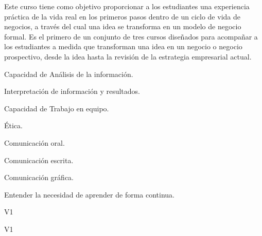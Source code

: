 \begin{syllabus}


\begin{justification}
Este curso tiene como objetivo proporcionar a los estudiantes una experiencia práctica de la vida  real en los  primeros pasos dentro de un ciclo de vida de negocios, a través del cual una idea se transforma en un modelo de negocio formal.
Es el primero de un conjunto de tres cursos diseñados para acompañar a los estudiantes a medida que transforman una idea en un negocio o negocio prospectivo, desde la idea  hasta la revisión de la estrategia empresarial actual.
\end{justification}

\begin{goals}
  \item Capacidad de Análisis de la información.
  \item Interpretación de información y resultados.
  \item Capacidad de Trabajo en equipo.
  \item Ética.
  \item Comunicación oral.
  \item Comunicación escrita.
  \item Comunicación gráfica.
  \item Entender la necesidad de aprender de forma continua.
\end{goals}

\begin{outcomes}{V1}
  \item {} 
  \item {} 
  \item {} 
  \item {} 
  \item {} 
\end{outcomes}

\begin{competences}{V1}
    \item {}
    \item {}
    \item {}
\end{competences}


\end{syllabus}
